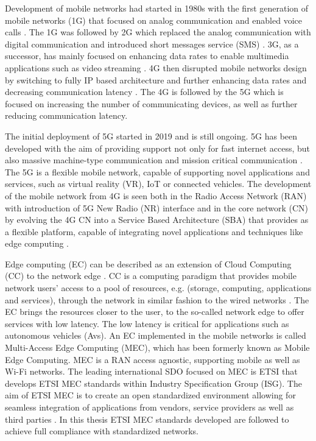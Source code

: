 \documentclass[12pt,a4paper,twoside]{report}
\begin{document}
Development of mobile networks had started in 1980s with the first generation of mobile networks (1G) that focused on analog communication and enabled voice calls \cite{sauter2017history}. The 1G was followed by 2G which replaced the analog communication with digital communication and introduced short messages service (SMS) \cite{sauter2017history}. 3G, as a successor, has mainly focused on enhancing data rates to enable multimedia applications such as video streaming \cite{sauter2017history}. 4G then disrupted mobile networks design by switching to fully IP based architecture and further enhancing data rates and decreasing communication latency \cite{sauter2017history,dahlman-2013-4g}. The 4G is followed by the 5G which is focused on increasing the number of communicating devices, as well as further reducing communication latency. 

The initial deployment of 5G started in 2019 and is still ongoing. 5G has been developed with the aim of providing support not only for fast internet access, but also massive machine-type communication and mission critical communication \cite{dahlman-2020-5g}. The 5G is a flexible mobile network, capable of supporting novel applications and services, such as virtual reality (VR), IoT or connected vehicles. The development of the mobile network from 4G is seen both in the Radio Access Network (RAN) with introduction of 5G New Radio (NR) interface and in the core network (CN) by evolving the 4G CN into a Service Based Architecture (SBA) that provides as a flexible platform, capable of integrating novel applications and techniques like edge computing \cite{sabella-mec-sw-dev}. 

Edge computing (EC) can be described as an extension of Cloud Computing (CC) to the network edge \cite{sabella-mec-sw-dev}. CC is a computing paradigm that provides mobile network users’ access to a pool of resources, e.g. (storage, computing, applications and services), through the network in similar fashion to the wired networks \cite{mell2011nistCC}. The EC brings the resources closer to the user, to the so-called network edge to offer services with low latency. The low latency is critical for applications such as autonomous vehicles (Avs). An EC implemented in the mobile networks is called Multi-Access Edge Computing (MEC), which has been formerly known as Mobile Edge Computing. MEC is a RAN access agnostic, supporting mobile as well as Wi-Fi networks. The leading international SDO focused on MEC is ETSI that develops ETSI MEC standards within Industry Specification Group (ISG). The aim of ETSI MEC is to create an open standardized environment allowing for seamless integration of applications from vendors, service providers as well as third parties \cite{mec-etsi-web}. In this thesis ETSI MEC standards developed are followed to achieve full compliance with standardized networks. 
\end{document}
